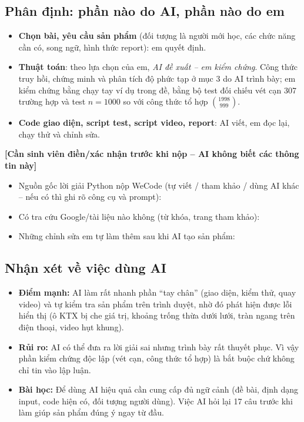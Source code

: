 \documentclass[12pt,a4paper]{article}
\begin{document}
\subsection{Phân định: phần nào do AI, phần nào do em}
\begin{itemize}
  \item \textbf{Chọn bài, yêu cầu sản phẩm} (đối tượng là người mới học, các chức năng cần có, song ngữ, hình thức report): em quyết định.
  \item \textbf{Thuật toán}: theo lựa chọn của em, \emph{AI đề xuất -- em kiểm chứng}. Công thức truy hồi, chứng minh và phân tích độ phức tạp ở mục 3 do AI trình bày; em kiểm chứng bằng chạy tay ví dụ trong đề, bằng bộ test đối chiếu vét cạn 307 trường hợp và test $n=1000$ so với công thức tổ hợp $\binom{1998}{999}$.
  \item \textbf{Code giao diện, script test, script video, report}: AI viết, em đọc lại, chạy thử và chỉnh sửa.
\end{itemize}

\begin{xacnhan}
\textbf{[Cần sinh viên điền/xác nhận trước khi nộp -- AI không biết các thông tin này]}
\begin{itemize}
  \item Nguồn gốc lời giải Python nộp WeCode (tự viết / tham khảo / dùng AI khác -- nếu có thì ghi rõ công cụ và prompt): \underline{\hspace{5cm}}
  \item Có tra cứu Google/tài liệu nào không (từ khóa, trang tham khảo): \underline{\hspace{5cm}}
  \item Những chỉnh sửa em tự làm thêm sau khi AI tạo sản phẩm: \underline{\hspace{5cm}}
\end{itemize}
\end{xacnhan}

\subsection{Nhận xét về việc dùng AI}
\begin{itemize}
  \item \textbf{Điểm mạnh:} AI làm rất nhanh phần ``tay chân'' (giao diện, kiểm thử, quay video) và tự kiểm tra sản phẩm trên trình duyệt, nhờ đó phát hiện được lỗi hiển thị (ô KTX bị che giá trị, khoảng trống thừa dưới lưới, tràn ngang trên điện thoại, video hụt khung).
  \item \textbf{Rủi ro:} AI có thể đưa ra lời giải sai nhưng trình bày rất thuyết phục. Vì vậy phần kiểm chứng độc lập (vét cạn, công thức tổ hợp) là bắt buộc chứ không chỉ tin vào lập luận.
  \item \textbf{Bài học:} Để dùng AI hiệu quả cần cung cấp đủ ngữ cảnh (đề bài, định dạng input, code hiện có, đối tượng người dùng). Việc AI hỏi lại 17 câu trước khi làm giúp sản phẩm đúng ý ngay từ đầu.
\end{itemize}
\end{document}
